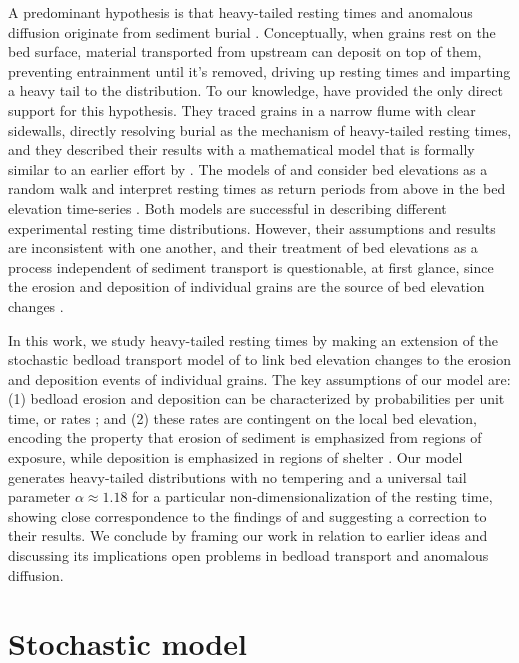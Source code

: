 \documentclass[draft]{agujournal2018}
\begin{document}
A predominant hypothesis is that heavy-tailed resting times and anomalous diffusion originate from sediment burial \citep{Voepel2013,Martin2014, Wu2019}.
Conceptually, when grains rest on the bed surface, material transported from upstream can deposit on top of them, preventing entrainment until it's removed, driving up resting times and imparting a heavy tail to the distribution.
To our knowledge, \citet{Martin2014} have provided the only direct support for this hypothesis.
They traced grains in a narrow flume with clear sidewalls, directly resolving burial as the mechanism of heavy-tailed resting times, and they described their results with a mathematical model that is formally similar to an earlier effort by \citet{Voepel2013}.
The models of \citet{Voepel2013} and \citet{Martin2014} consider bed elevations as a random walk and interpret resting times as return periods from above in the bed elevation time-series \citep[e.g.][]{Redner2007}.
Both models are successful in describing different experimental resting time distributions.
However, their assumptions and results are inconsistent with one another, and their treatment of bed elevations as a process independent of sediment transport is questionable, at first glance, since the erosion and deposition of individual grains are the source of bed elevation changes \citep[e.g.][]{Wong2007}.

In this work, we study heavy-tailed resting times by making an extension of the stochastic bedload transport model of \citet{Ancey2008} to link bed elevation changes to the erosion and deposition events of individual grains.
The key assumptions of our model are: (1) bedload erosion and deposition can be characterized by probabilities per unit time, or rates \citep[e.g.][]{Einstein1950, Ancey2008}; and (2) these rates are contingent on the local bed elevation, encoding the property that erosion of sediment is emphasized from regions of exposure, while deposition is emphasized in regions of shelter \citep[e.g.][]{Sawai1987, Wong2007}.
Our model generates heavy-tailed distributions with no tempering and a universal tail parameter $\alpha \approx 1.18$ for a particular non-dimensionalization of the resting time, showing close correspondence to the findings of \citet{Martin2014} and suggesting a correction to their results.
We conclude by framing our work in relation to earlier ideas and discussing its implications open problems in bedload transport and anomalous diffusion.

\section{Stochastic model}
\label{sec:model}
\end{document}
